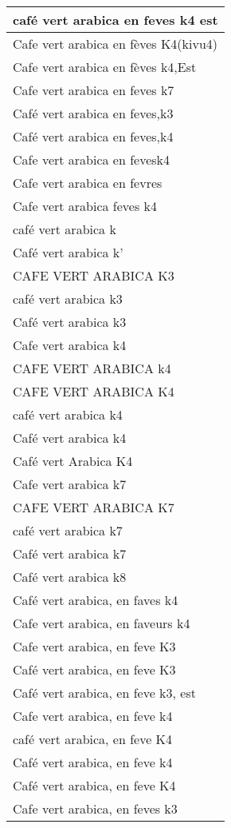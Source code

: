 \documentclass[
]{book}
\begin{document}
\begin{table}
\begin{tabular}[t]{l}
\hline
café vert arabica en feves k4 est\\
\hline
Cafe vert arabica en fèves K4(kivu4)\\
\hline
Cafe vert arabica en fèves k4,Est\\
\hline
Cafe vert arabica en feves k7\\
\hline
Café vert arabica en feves,k3\\
\hline
Café vert arabica en feves,k4\\
\hline
Cafe vert arabica en fevesk4\\
\hline
Cafe vert arabica en fevres\\
\hline
Cafe vert arabica feves k4\\
\hline
café vert arabica k\\
\hline
Café vert arabica k'\\
\hline
CAFE VERT ARABICA K3\\
\hline
café vert arabica k3\\
\hline
Café vert arabica k3\\
\hline
Cafe vert arabica k4\\
\hline
CAFE VERT ARABICA k4\\
\hline
CAFE VERT ARABICA K4\\
\hline
café vert arabica k4\\
\hline
Café vert arabica k4\\
\hline
Café vert Arabica K4\\
\hline
Cafe vert arabica k7\\
\hline
CAFE VERT ARABICA K7\\
\hline
café vert arabica k7\\
\hline
Café vert arabica k7\\
\hline
Café vert arabica k8\\
\hline
Café vert arabica, en faves k4\\
\hline
Cafe vert arabica, en faveurs k4\\
\hline
Cafe vert arabica, en feve K3\\
\hline
Café vert arabica, en feve K3\\
\hline
Café vert arabica, en feve k3, est\\
\hline
Cafe vert arabica, en feve k4\\
\hline
café vert arabica, en feve K4\\
\hline
Café vert arabica, en feve k4\\
\hline
Café vert arabica, en feve K4\\
\hline
Cafe vert arabica, en feves k3\\

\end{tabular}
\end{table}
\end{document}
